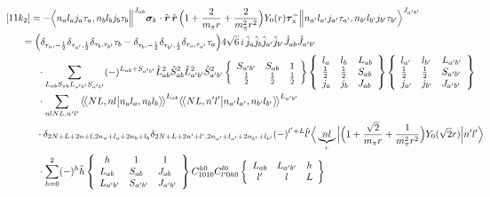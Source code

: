 \documentclass[master]{shnuthesis}
\newcommand{\llangle}{\big\langle\!\big\langle}
\newcommand{\rrangle}{\big\rangle\!\big\rangle}
\newcommand{\bmr}{\textbf{\textit{r}}}
\newcommand{\ap}{a^\prime}
\newcommand{\bp}{b^\prime}
\newcommand{\il}{\!\!\!\!\!\!\!\!\!\!}
\newcommand{\ii}{\!\!\!\!\!\!\!\!\!\!\!\!\!\!\!\!\!\!\!\!}
\begin{document}
\begin{align}
    &\ii [11k_2] = -\Big\langle n_a l_a j_a \tau_a, n_b l_b j_b \tau_b \Big\|^{J_{ab}} \bm{\sigma}_k\cdot\hat{\bmr}\,\hat{\bmr} \,\Big(1+\frac{2}{m_\pi r}+\frac{2}{m_\pi^2 r^2}\Big)Y_0(r)\bm{\tau}_\times^- \Big\| n_{\ap} l_{\ap} j_{\ap} \tau_{\ap}, n_{\bp} l_{\bp} j_{\bp} \tau_{\bp} \Big\rangle^{J_{\ap \bp}} \notag\\
    &\il = \Big( \delta_{\tau_a,-\frac{1}{2}}\delta_{\tau_{\ap},\frac{1}{2}}\delta_{\tau_b,\tau_{\bp}}\tau_b - \delta_{\tau_b,-\frac{1}{2}}\delta_{\tau_{\bp},\frac{1}{2}}\delta_{\tau_a,\tau_{\ap}}\tau_a \Big) 4\sqrt{6}\,i\,\hat{j}_a\hat{j}_b\hat{j}_{\ap}\hat{j}_{\bp} \hat{J}_{ab}\hat{J}_{\ap\bp}  \notag \\
    & \cdot \sum_{L_{ab}S_{ab}L_{\ap\bp}S_{\ap\bp}} (-)^{L_{ab}+S_{\ap\bp}} \hat{L}_{ab}^2\hat{S}_{ab}^2\hat{L}_{\ap\bp}^2\hat{S}_{\ap\bp}^2  \left\{\begin{array}{ccc} S_{\ap\bp} & S_{ab} & 1 \\ \frac{1}{2} & \frac{1}{2} & \frac{1}{2} \end{array}\right\}  \left\{\begin{array}{lll}l_{a} & l_{b} & L_{ab} \\ \frac{1}{2} & \frac{1}{2} & S_{ab} \\j_{a} & j_{b} & J_{ab} \end{array}\right\} \left\{\begin{array}{lll}l_{\ap} & l_{\bp} & L_{\ap\bp} \\ \frac{1}{2} & \frac{1}{2} & S_{\ap\bp} \\j_{\ap} & j_{\bp} & J_{\ap\bp} \end{array}\right\}  \notag\\
    & \cdot \sum_{nlNL,n^\prime l^\prime} \llangle N L, n l \big| n_{a} l_{a}, n_{b} l_{b} \rrangle^{L_{ab}} \llangle N L, n^\prime l^\prime \big| n_{a^\prime} l_{a^\prime}, n_{b^\prime} l_{b^\prime} \rrangle^{L_{\ap\bp}} \notag\\
    &\! \cdot \delta_{2N+L+2n+l,2n_a+l_a+2n_b+l_b}\delta_{2N+L+2n^\prime+l^\prime,2n_{a^\prime}+l_{a^\prime}+2n_{b^\prime}+l_{b^\prime}} (-)^{l^\prime+L}\hat{l^\prime} \Big\langle \underbrace{n l}_{r} \Big| \Big(1+\frac{\sqrt{2}}{m_\pi r}+\frac{1}{m_\pi^2 r^2}\Big) Y_0(\sqrt{2}r) \Big| n^\prime l^\prime \Big\rangle  \notag\\
    & \cdot \sum_{h=0}^{2} (-)^{h}\hat{h} \left\{\begin{array}{lll} \,\,\,h & \,\,\,1 & \,\,\,1 \\ L_{ab} & S_{ab} & J_{ab} \\ L_{\ap\bp} & S_{\ap\bp} & J_{\ap\bp} \end{array}\right\}  C_{1010}^{h0}C_{l^\prime 0 h 0}^{l0}  \left\{\begin{array}{ccc} L_{ab} & L_{\ap\bp} & h \\ l^\prime & l & L \end{array}\right\}
\end{align}
\end{document}
